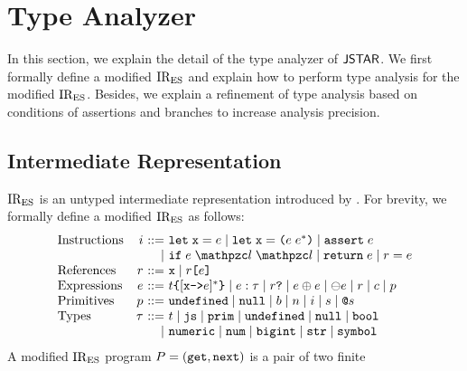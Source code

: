 \section{Type Analyzer}\label{sec:analyzer}

In this section, we explain the detail of the type analyzer of $\textsf{JSTAR}$. We first
formally define a modified ${\text{IR}_\text{ES}}$ and explain how to perform type analysis
for the modified ${\text{IR}_\text{ES}}$.  Besides, we explain a refinement of type analysis
based on conditions of assertions and branches to increase analysis precision.

\subsection{Intermediate Representation}\label{sec:ires}

${\text{IR}_\text{ES}}$ is an untyped intermediate representation introduced by \citet{jiset}.
For brevity, we formally define a modified ${\text{IR}_\text{ES}}$ as follows:
\[
  \begin{array}{lr@{~}r@{~}l}
    \text{Instructions}
    & \inst &::=&
    \kwlet \; \x = \expr \mid
    \kwlet \; \x = \kwrl \expr \; \expr^* \kwrr \mid
    \kwassert \; \expr \\

    &&\mid&
    \kwif \; \expr \; \lab \; \lab \mid
    \kwreturn \; \expr \mid
    \refer = \expr \\

    \text{References}
    & \refer &::=&
    \x \mid
    \refer \kwsl \expr \kwsr \\

    \text{Expressions}
    & \expr &::=&
    \tname \kwcl [\x \kwarrow \expr]^* \kwcr \mid
    \expr: \ty \mid
    \refer \kwexists \mid
    \expr \bop \expr \mid
    \uop \expr \mid
    \refer \mid
    \const \mid
    \prim \\

    \text{Primitives}
    & \prim &::=&
    \undefval \mid \nullval \mid \bool \mid
    \num \mid \bigint \mid \str \mid \symb \\

    \text{Types}
    & \ty &::=& \tname \mid \tjs \mid \tprim \mid
    \undefval \mid \nullval \mid \tbool\\

    &&\mid&
    \tnumeric \mid \tnum \mid \tbigint \mid \tstr \mid \tsymb \\
  \end{array}
\]
A modified ${\text{IR}_\text{ES}}$ program $P = (\texttt{get}, \texttt{next})$ is a pair of two finite
